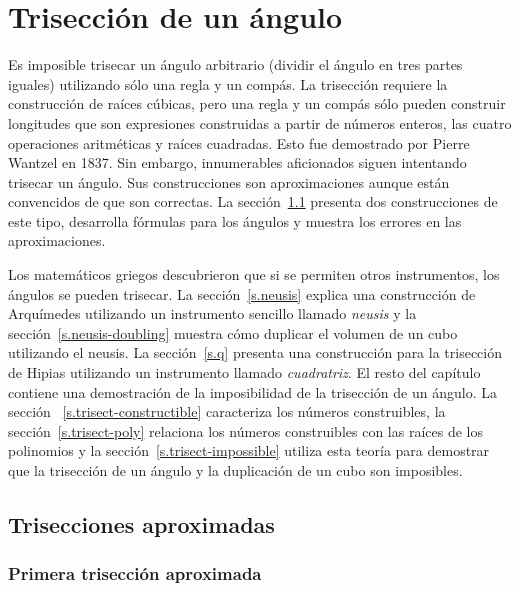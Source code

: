 
\chapter{Trisección de un ángulo}\label{c.trisect}


Es imposible trisecar un ángulo arbitrario (dividir el ángulo en tres partes iguales) utilizando sólo una regla y un compás. La trisección requiere la construcción de raíces cúbicas, pero una regla y un compás sólo pueden construir longitudes que son expresiones construidas a partir de números enteros, las cuatro operaciones aritméticas y raíces cuadradas. Esto fue demostrado por Pierre Wantzel en 1837. Sin embargo, innumerables aficionados siguen intentando trisecar un ángulo. Sus construcciones son aproximaciones aunque están convencidos de que son correctas. La sección~\ref{s.trisect-approx} presenta dos construcciones de este tipo, desarrolla fórmulas para los ángulos y muestra los errores en las aproximaciones.

Los matemáticos griegos descubrieron que si se permiten otros instrumentos, los ángulos se pueden trisecar. La sección~\ref{s.neusis} explica una construcción de Arquímedes utilizando un instrumento sencillo llamado \emph{neusis} y la sección~\ref{s.neusis-doubling} muestra cómo duplicar el volumen de un cubo utilizando el neusis. La sección~\ref{s.q} presenta una construcción para la trisección de Hipias utilizando un instrumento llamado \emph{cuadratriz}. El resto del capítulo contiene una demostración de la imposibilidad de la trisección de un ángulo. La sección ~\ref{s.trisect-constructible} caracteriza los números construibles, la sección~\ref{s.trisect-poly} relaciona los números construibles con las raíces de los polinomios y la sección~\ref{s.trisect-impossible} utiliza esta teoría para demostrar que la trisección de un ángulo y la duplicación de un cubo son imposibles.


\section{Trisecciones aproximadas}\label{s.trisect-approx}

\subsection{Primera trisección aproximada}\label{sub.trisect-approx1}

